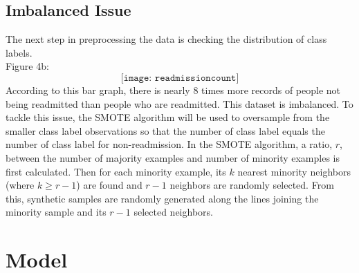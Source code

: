 \documentclass{article}
\begin{document}
\subsection{Imbalanced Issue} 
The next step in preprocessing the data is checking the distribution of class labels. \\
Figure 4b: $$ \texttt{[image: readmissioncount]} $$ 
According to this bar graph, there is nearly $8$ times more records of people not being readmitted than people who are readmitted. This dataset is imbalanced. To tackle this issue, the SMOTE algorithm will be used to oversample from the smaller class label observations so that the number of class label equals the number of class label for non-readmission. In the SMOTE algorithm, a ratio, $r$, between the number of majority examples and number of minority examples is first calculated. Then for each minority example, its $k$ nearest minority neighbors (where $k \geq r -1$) are found and $r-1$ neighbors are randomly selected. From this, synthetic samples are randomly generated along the lines joining the minority sample and its $r-1$ selected neighbors. 

\section{Model}
\end{document}
